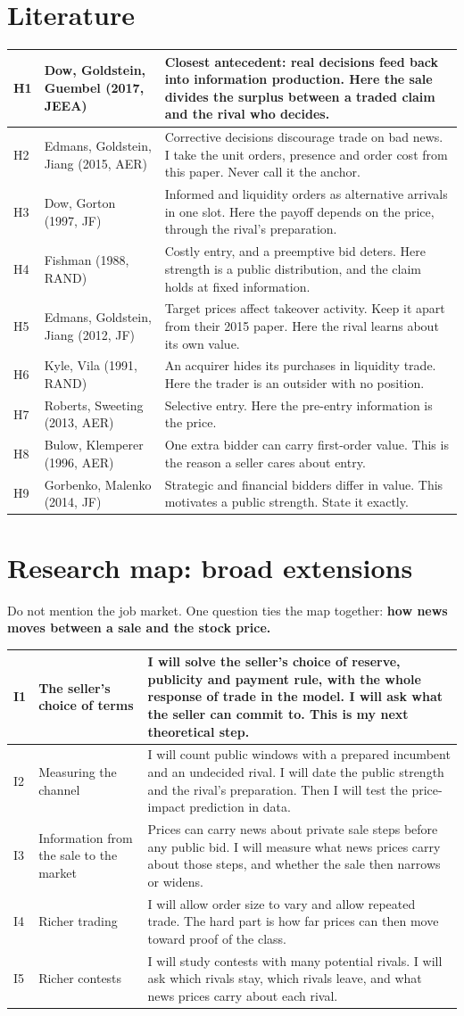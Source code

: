 \documentclass[10.5pt]{article}
\makeatletter
\newenvironment{cards}{\begin{longtable}{@{}IQA@{}}}{\end{longtable}}
\newcommand{\card}[3]{#1 & #2 & #3\\\midrule}
\makeatother
\begin{document}
\section{Literature}
\begin{cards}
\card{H1}{Dow, Goldstein, Guembel (2017, JEEA)}{Closest antecedent: real decisions feed back into information production. Here the sale divides the surplus between a traded claim and the rival who decides.}
\card{H2}{Edmans, Goldstein, Jiang (2015, AER)}{Corrective decisions discourage trade on bad news. I take the unit orders, presence and order cost from this paper. Never call it the anchor.}
\card{H3}{Dow, Gorton (1997, JF)}{Informed and liquidity orders as alternative arrivals in one slot. Here the payoff depends on the price, through the rival's preparation.}
\card{H4}{Fishman (1988, RAND)}{Costly entry, and a preemptive bid deters. Here strength is a public distribution, and the claim holds at fixed information.}
\card{H5}{Edmans, Goldstein, Jiang (2012, JF)}{Target prices affect takeover activity. Keep it apart from their 2015 paper. Here the rival learns about its own value.}
\card{H6}{Kyle, Vila (1991, RAND)}{An acquirer hides its purchases in liquidity trade. Here the trader is an outsider with no position.}
\card{H7}{Roberts, Sweeting (2013, AER)}{Selective entry. Here the pre-entry information is the price.}
\card{H8}{Bulow, Klemperer (1996, AER)}{One extra bidder can carry first-order value. This is the reason a seller cares about entry.}
\card{H9}{Gorbenko, Malenko (2014, JF)}{Strategic and financial bidders differ in value. This motivates a public strength. State it exactly.}
\end{cards}

\section{Research map: broad extensions}
Do not mention the job market. One question ties the map together: \textbf{how news moves between a sale and the stock price.}
\begin{cards}
\card{I1}{The seller's choice of terms}{I will solve the seller's choice of reserve, publicity and payment rule, with the whole response of trade in the model. I will ask what the seller can commit to. This is my next theoretical step.}
\card{I2}{Measuring the channel}{I will count public windows with a prepared incumbent and an undecided rival. I will date the public strength and the rival's preparation. Then I will test the price-impact prediction in data.}
\card{I3}{Information from the sale to the market}{Prices can carry news about private sale steps before any public bid. I will measure what news prices carry about those steps, and whether the sale then narrows or widens.}
\card{I4}{Richer trading}{I will allow order size to vary and allow repeated trade. The hard part is how far prices can then move toward proof of the class.}
\card{I5}{Richer contests}{I will study contests with many potential rivals. I will ask which rivals stay, which rivals leave, and what news prices carry about each rival.}
\end{cards}
\end{document}
